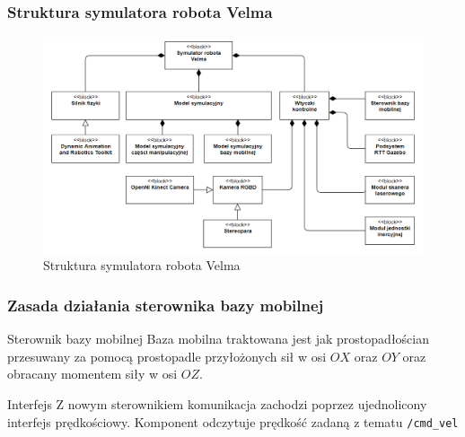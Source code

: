 \begin{frame}
    \frametitle{Struktura symulatora robota Velma} 
    \begin{figure}[b]
        \label{sim_system}
        \centering
        \def\svgwidth{\columnwidth}
        \vspace{0.1cm}
        \includegraphics[scale=0.36]{images/sim_system.png}
        \vspace{0.1cm}
        \caption{Struktura symulatora robota Velma}
    \end{figure}
\end{frame}

\begin{frame}
    \frametitle{Zasada działania sterownika bazy mobilnej} 
    \begin{block}{Sterownik bazy mobilnej}
        Baza mobilna traktowana jest jak prostopadłościan przesuwany za pomocą prostopadle przyłożonych
        sił w osi $OX$ oraz $OY$ oraz obracany momentem siły w osi $OZ$.
    \end{block}

    \begin{block}{Interfejs}
        Z nowym sterownikiem komunikacja zachodzi poprzez ujednolicony interfejs prędkościowy.
        Komponent odczytuje prędkość zadaną z tematu \texttt{/cmd\_{}vel}
    \end{block}
\end{frame}


